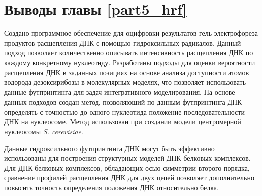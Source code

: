 

\section{Выводы главы \ref{part5_hrf}}
Создано программное обеспечение для оцифровки результатов гель-электрофореза продуктов расщепления ДНК с помощью гидроксильных радикалов. Данный подход позволяет количественно описывать интенсивность расщепления ДНК по каждому конкретному нуклеотиду. Разработаны подходы для оценки вероятности расщепления ДНК в заданных позициях на основе анализа доступности атомов водорода дезоксирибозы в молекулярных моделях, что позволяет использовать данные футпринтинга для задач интегративного моделирования. На основе данных подходов создан метод, позволяющий по данным футпринтинга ДНК определять с точностью до одного нуклеотида положение последовательности ДНК на нуклеосоме. Метод использован при создании модели центромерной нуклеосомы \textit{S. cerevisiae}.

Данные гидроксильного футпринтинга ДНК могут быть эффективно использованы для построения структурных моделей ДНК-белковых комплексов. Для ДНК-белковых комплексов, обладающих осью симметрии второго порядка, сравнение профилей расщепления ДНК для двух цепей позволяет дополнительно повысить точность определения положения ДНК относительно белка. 

